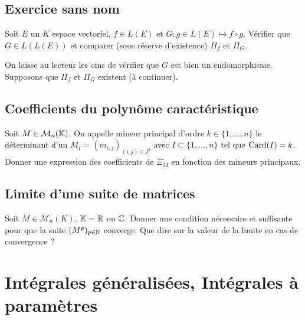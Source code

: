 \subsection{Exercice sans nom}
\begin{exo}
 Soit $E$ un $K$ espace vectoriel, $f\in L(E)$ et $G:g\in L(E)\mapsto f\circ g$. Vérifier que $G\in L(L(E))$ et comparer (sous réserve d'existence) $\Pi_f$ et $\Pi_G$.
\end{exo}

\begin{sol}
	On laisse au lecteur les oins de vérifier que $G$ est bien un endomorphisme. Supposons que $\Pi_f$ et $\Pi_G$ existent (à continuer).
\end{sol}

\subsection{Coefficients du polynôme caractéristique}
\begin{exo}
	Soit $M\in\mathcal M_n(\mathbb{K})$. On appelle mineur principal d'ordre $k\in\lbrace1,\dots,n\rbrace$ le déterminant d'un $M_I=(m_{i,j})_{(i,j)\in I^2}$ avec $I\subset\lbrace 1,\dots,n\rbrace$ tel que $\text{Card}(I)=k$. Donner une expression des coefficients de $\Xi_M$ en fonction des mineurs principaux.
\end{exo}

\begin{sol}
	[À rédiger]
\end{sol}

\subsection{Limite d'une suite de matrices}
\begin{exo}
	Soit $M\in\mathcal M_n(K)$, $\mathbb{K} = \mathbb{R}$ ou $\mathbb{C}$. Donner une condition nécessaire et suffisante pour que la suite $(M^p)_{p\in\mathbb{N}}$ converge. Que dire sur la valeur de la limite en cas de convergence ?
\end{exo}

\begin{sol}
	[À rédiger]
\end{sol}


%
%

\newpage
\section[Intégrales généralisées, Intégrales à paramètres]{Intégrales généralisées, Intégrales à paramètres}
